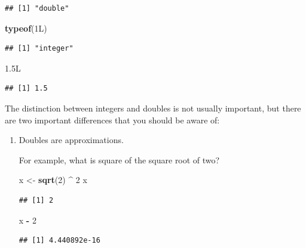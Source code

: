 \documentclass[
]{book}
\newenvironment{Shaded}{\begin{snugshade}}{\end{snugshade}}
\newcommand{\DecValTok}[1]{\textcolor[rgb]{0.00,0.00,0.81}{#1}}
\newcommand{\FloatTok}[1]{\textcolor[rgb]{0.00,0.00,0.81}{#1}}
\newcommand{\KeywordTok}[1]{\textcolor[rgb]{0.13,0.29,0.53}{\textbf{#1}}}
\newcommand{\NormalTok}[1]{#1}
\newcommand{\OperatorTok}[1]{\textcolor[rgb]{0.81,0.36,0.00}{\textbf{#1}}}
\newcommand{\StringTok}[1]{\textcolor[rgb]{0.31,0.60,0.02}{#1}}
\begin{document}
\begin{verbatim}
## [1] "double"
\end{verbatim}

\begin{Shaded}
\begin{Highlighting}[]
\KeywordTok{typeof}\NormalTok{(1L)}
\end{Highlighting}
\end{Shaded}

\begin{verbatim}
## [1] "integer"
\end{verbatim}

\begin{Shaded}
\begin{Highlighting}[]
\FloatTok{1.5}\NormalTok{L}
\end{Highlighting}
\end{Shaded}

\begin{verbatim}
## [1] 1.5
\end{verbatim}

The distinction between integers and doubles is not usually important, but there are two important differences that you should be aware of:

\begin{enumerate}
\def\labelenumi{\arabic{enumi}.}
\item
  Doubles are approximations.

  For example, what is square of the square root of two?

\begin{Shaded}
\begin{Highlighting}[]
\NormalTok{x <-}\StringTok{ }\KeywordTok{sqrt}\NormalTok{(}\DecValTok{2}\NormalTok{) }\OperatorTok{^}\StringTok{ }\DecValTok{2}
\NormalTok{x}
\end{Highlighting}
\end{Shaded}

\begin{verbatim}
## [1] 2
\end{verbatim}

\begin{Shaded}
\begin{Highlighting}[]
\NormalTok{x }\OperatorTok{-}\StringTok{ }\DecValTok{2}
\end{Highlighting}
\end{Shaded}

\begin{verbatim}
## [1] 4.440892e-16
\end{verbatim}
\end{enumerate}
\end{document}
